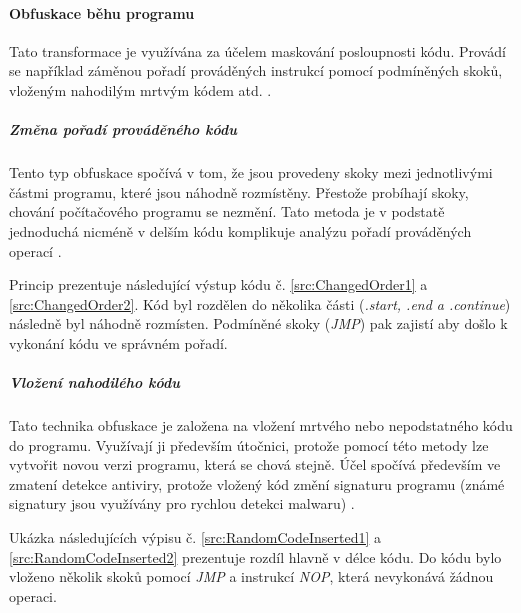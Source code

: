 \paragraph*{Obfuskace běhu programu}
Tato transformace je využívána za účelem maskování posloupnosti kódu. Provádí se například záměnou pořadí prováděných instrukcí pomocí podmíněných skoků, vloženým nahodilým mrtvým kódem atd. \cite{13355040520180901}.


\subparagraph*{Změna pořadí prováděného kódu}
Tento typ obfuskace spočívá v tom, že jsou provedeny skoky mezi jednotlivými částmi programu, které jsou náhodně rozmístěny. Přestože probíhají skoky, chování počítačového programu se nezmění. Tato metoda je v podstatě jednoduchá nicméně v delším kódu komplikuje analýzu pořadí prováděných operací \cite{13355040520180901}. 

Princip prezentuje následující výstup kódu č. \ref{src:ChangedOrder1} a \ref{src:ChangedOrder2}. Kód byl rozdělen do několika části (\emph{.start, .end a .continue}) následně byl náhodně rozmísten. Podmíněné skoky (\emph{JMP}) pak zajistí aby došlo k vykonání kódu ve správném pořadí.

\noindent
\begin{minipage}[t]{.475\textwidth}
    
\end{minipage}
\hfill
\begin{minipage}[t]{.475\textwidth}
    
\end{minipage}

\subparagraph*{Vložení nahodilého kódu}
Tato technika obfuskace je založena na vložení mrtvého nebo nepodstatného kódu do programu. Využívají ji především útočnici, protože pomocí této metody lze vytvořit novou verzi programu, která se chová stejně. Účel spočívá především ve zmatení detekce antiviry, protože vložený kód změní signaturu programu (známé signatury jsou využívány pro rychlou detekci malwaru) \cite{13355040520180901}. 

Ukázka následujících výpisu č. \ref{src:RandomCodeInserted1} a \ref{src:RandomCodeInserted2} prezentuje rozdíl hlavně v délce kódu. Do kódu bylo vloženo několik skoků pomocí \emph{JMP} a instrukcí \emph{NOP}, která nevykonává žádnou operaci.

